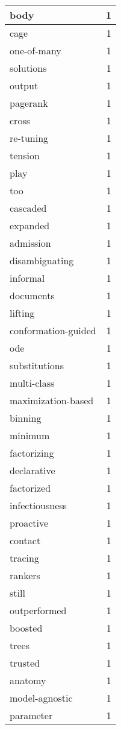 \begin{table}[h]
\begin{tabular}{|l|r|}
\hline
body & 1 \\
\hline
cage & 1 \\
\hline
one-of-many & 1 \\
\hline
solutions & 1 \\
\hline
output & 1 \\
\hline
pagerank & 1 \\
\hline
cross & 1 \\
\hline
re-tuning & 1 \\
\hline
tension & 1 \\
\hline
play & 1 \\
\hline
too & 1 \\
\hline
cascaded & 1 \\
\hline
expanded & 1 \\
\hline
admission & 1 \\
\hline
disambiguating & 1 \\
\hline
informal & 1 \\
\hline
documents & 1 \\
\hline
lifting & 1 \\
\hline
conformation-guided & 1 \\
\hline
ode & 1 \\
\hline
substitutions & 1 \\
\hline
multi-class & 1 \\
\hline
maximization-based & 1 \\
\hline
binning & 1 \\
\hline
minimum & 1 \\
\hline
factorizing & 1 \\
\hline
declarative & 1 \\
\hline
factorized & 1 \\
\hline
infectiousness & 1 \\
\hline
proactive & 1 \\
\hline
contact & 1 \\
\hline
tracing & 1 \\
\hline
rankers & 1 \\
\hline
still & 1 \\
\hline
outperformed & 1 \\
\hline
boosted & 1 \\
\hline
trees & 1 \\
\hline
trusted & 1 \\
\hline
anatomy & 1 \\
\hline
model-agnostic & 1 \\
\hline
parameter & 1 \\

\end{tabular}
\end{table}
